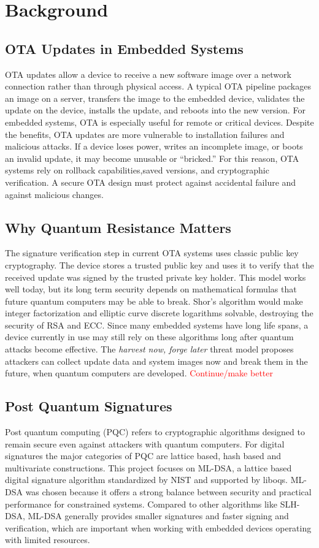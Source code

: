\documentclass[12pt]{article}
\begin{document}
\section{Background}
\subsection{OTA Updates in Embedded Systems}
OTA updates allow a device to receive a new software image over a network connection
rather than through physical access. A typical OTA pipeline packages an image on
a server, transfers the image to the embedded device, validates the update on the device, installs the update, and reboots into the new version. For embedded systems,
OTA is especially useful for remote or critical devices. 
Despite the benefits, OTA updates are more vulnerable to installation failures and malicious attacks. If a device loses power, writes an incomplete
image, or boots an invalid update, it may become unusable or “bricked.” For this reason,
OTA systems rely on rollback capabilities,saved versions, and cryptographic
verification. A secure OTA design must protect against accidental
failure and against malicious changes. 
\subsection{Why Quantum Resistance Matters}
The signature verification step in current OTA systems uses classic public key
cryptography. The device stores a trusted public key and uses it to verify that the received
update was signed by the trusted private key holder. This model works well today, but its
long term security depends on mathematical formulas that future quantum computers may be able to break.
Shor’s algorithm would make integer factorization and elliptic curve discrete
logarithms solvable, destroying the security of RSA and ECC.
Since many embedded systems have long life spans, a device currently in use may still rely on these algorithms long after quantum attacks become effective. The \textit{harvest now, forge later}
threat model proposes attackers can collect update data and system images now and break them in the future, when quantum computers are developed. \textcolor{red}{Continue/make better}
\subsection{Post Quantum Signatures}
Post quantum computing (PQC) refers to cryptographic algorithms designed to remain secure even against attackers with quantum computers. For digital signatures the major categories of PQC are lattice based, hash based and multivariate constructions. This project focuses on ML-DSA, a lattice based digital signature algorithm  standardized by NIST and supported 
by liboqs.
ML-DSA was chosen because it offers a strong balance between security and practical performance for constrained systems. Compared to other algorithms like SLH-DSA, ML-DSA
generally provides smaller signatures and faster signing and verification, which are important when working with embedded devices operating with limited resources.
\end{document}

